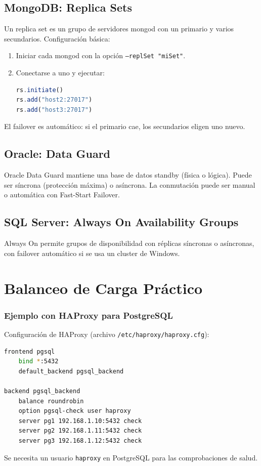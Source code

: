 \documentclass[12pt,a4paper,openany,oneside]{book}
\begin{document}
\section{MongoDB: Replica Sets}
Un replica set es un grupo de servidores mongod con un primario y varios secundarios. Configuración básica:
\begin{enumerate}
    \item Iniciar cada mongod con la opción \texttt{--replSet "miSet"}.
    \item Conectarse a uno y ejecutar:
\begin{lstlisting}[language=JavaScript]
rs.initiate()
rs.add("host2:27017")
rs.add("host3:27017")
\end{lstlisting}
\end{enumerate}
El failover es automático: si el primario cae, los secundarios eligen uno nuevo.

\section{Oracle: Data Guard}
Oracle Data Guard mantiene una base de datos standby (física o lógica). Puede ser síncrona (protección máxima) o asíncrona. La conmutación puede ser manual o automática con Fast-Start Failover.

\section{SQL Server: Always On Availability Groups}
Always On permite grupos de disponibilidad con réplicas síncronas o asíncronas, con failover automático si se usa un cluster de Windows.

\chapter{Balanceo de Carga Práctico}
\subsection{Ejemplo con HAProxy para PostgreSQL}
Configuración de HAProxy (archivo \texttt{/etc/haproxy/haproxy.cfg}):
\begin{lstlisting}[language=Bash]
frontend pgsql
    bind *:5432
    default_backend pgsql_backend

backend pgsql_backend
    balance roundrobin
    option pgsql-check user haproxy
    server pg1 192.168.1.10:5432 check
    server pg2 192.168.1.11:5432 check
    server pg3 192.168.1.12:5432 check
\end{lstlisting}
Se necesita un usuario \texttt{haproxy} en PostgreSQL para las comprobaciones de salud.
\end{document}
